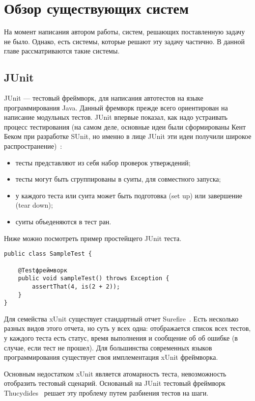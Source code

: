 \chapter{Обзор существующих систем}
\label{chapter2}

На момент написания автором работы, систем, решающих поставленную задачу не было. Однако, есть системы, которые решают эту задачу частично. В данной главе рассматриваются такие системы.

\section{JUnit}

JUnit --- тестовый фреймворк, для написания автотестов на языке программирования Java. Данный фремворк прежде всего ориентирован на написание модульных тестов. JUnit впервые показал, как надо устраивать процесс тестирования (на самом деле, основные идеи были сформированы Кент Беком при разработке SUnit, но именно в лице JUnit эти идеи получили широкое распространение)~\cite{xunit_test_patterns}:

\begin{itemize}
\item тесты представляют из себя набор проверок утверждений;
\item тесты могут быть сгруппированы в суиты, для совместного запуска;
\item у каждого теста или суита может быть подготовка (set up) или завершение (tear down);
\item суиты объеденяются в тест ран.
\end{itemize}

Ниже можно посмотреть пример простейщего JUnit теста.

\begin{lstlisting}[caption=Простой JUnit тест.]
public class SampleTest {

    @Testфреймворк
    public void sampleTest() throws Exception {
        assertThat(4, is(2 + 2));
    }
}
\end{lstlisting}

Для семейства xUnit существует стандартный отчет Surefire~\cite{surefire_home}. Есть несколько разных видов этого отчета, но суть у всех одна: отображается список всех тестов, у каждого теста есть статус, время выполнения и сообщение об об ошибке (в случае, если тест не прошел). Для большинства современных языков программирования существует своя имплементация xUnit фреймворка. 

Основным недостатком xUnit является атомарность теста, невозможность отобразить тестовый сценарий. Основаный на JUnit тестовый фреймворк Thucydides~\cite{thucydides_home} решает эту проблему путем разбиения тестов на шаги. 

